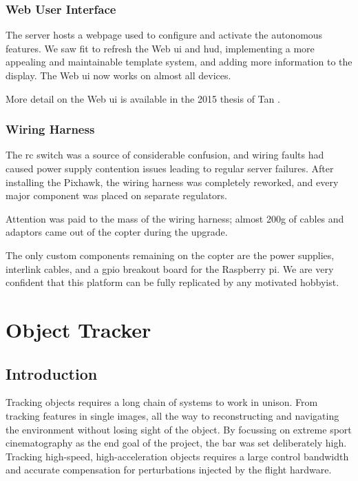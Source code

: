 \documentclass[a4paper, 11pt, titlepage]{article}
\begin{document}
    \subsubsection{Web User Interface}
      The server hosts a webpage used to configure and activate the autonomous features.
      We saw fit to refresh the Web \gls{ui} and \gls{hud}, implementing a more appealing and maintainable template system, and adding more information to the display.
      The Web \gls{ui} now works on almost all devices.

      More detail on the Web \gls{ui} is available in the 2015 thesis of Tan \cite{Tan}.

    \subsubsection{Wiring Harness}
      The \gls{rc} switch was a source of considerable confusion, and wiring faults had caused power supply contention issues leading to regular server failures.
      After installing the Pixhawk, the wiring harness was completely reworked, and every major component was placed on separate regulators.

      Attention was paid to the mass of the wiring harness; almost 200g of cables and adaptors came out of the copter during the upgrade.

      The only custom components remaining on the copter are the power supplies, interlink cables, and a \gls{gpio} breakout board for the Raspberry pi.  We are very confident that this platform can be fully replicated by any motivated hobbyist.

\section{Object Tracker}
  \subsection{Introduction}

    Tracking objects requires a long chain of systems to work in unison.  From tracking features in single images, all the way to reconstructing and navigating the environment without losing sight of the object.
    By focussing on extreme sport cinematography as the end goal of the project, the bar was set deliberately high.
    Tracking high-speed, high-acceleration objects requires a large control bandwidth and accurate compensation for perturbations injected by the flight hardware.  
\end{document}
